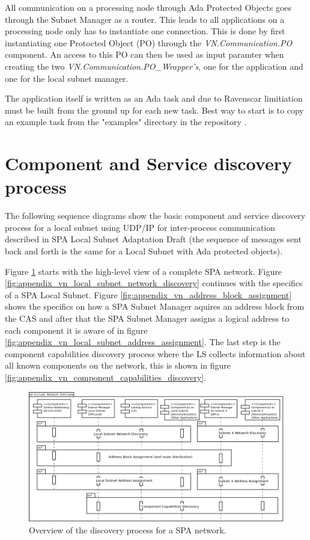 All communication on a processing node through Ada Protected Objects goes
through the Subnet Manager as a router. This leads to all applications on
a processing node only has to instantiate one connection. This is done by first
instantiating one Protocted Object (PO) through the \newline \emph{VN.Communication.PO}
component. An access to this PO can then be used as input paramter when
creating the two \emph{VN.Communication.PO\_Wrapper's}, one for the application
and one for the local subnet manager.

The application itself is written as an Ada task and due to Ravenscar
limitiation must be built from the ground up for each new task. Best way to
start is to copy an example task from the "examples" directory in the
repository \cite{web:github-vn-lib}.

\section{Component and Service discovery process}\label{sec:discovery_process}
The following sequence diagrams show the basic component and service discovery
process for a local subnet using UDP/IP for inter-process communication
described in SPA Local Subnet Adaptation Draft \cite{spa:local-subnet} (the
sequence of messages sent back and forth is the same for a Local Subnet with
Ada protected objects).

Figure
\ref{fig:appendix_vn_discovery_overview} starts with the high-level view of a
complete SPA network. Figure
\ref{fig:appendix_vn_local_subnet_network_discovery} continues with the
specifics of a SPA Local Subnet. Figure
\ref{fig:appendix_vn_address_block_assignment} shows the specifics on how a SPA
Subnet Manager aquires an address block from the CAS and after that the SPA
Subnet Manager assigns a logical address to each component it is aware of in
figure \ref{fig:appendix_vn_local_subnet_address_assignment}. The last step is the
component capabilities discovery process where the LS collects
information about all known components on the network, this is shown in figure
\ref{fig:appendix_vn_component_capabilities_discovery}.

\begin{figure}[h]
    \centering
    \includegraphics[width=\textwidth]{figures/vn_discovery_overview}
    \caption{Overview of the discovery process for a SPA network.}
    \label{fig:appendix_vn_discovery_overview}
\end{figure}

